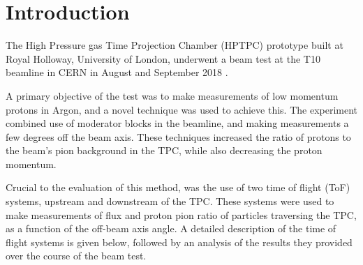 \section{Introduction}

The High Pressure gas Time Projection Chamber (HPTPC) prototype built at Royal Holloway, University of London, underwent a beam test at the T10 beamline in CERN in August and September 2018 \cite{SPSC-P-355}.

A primary objective of the test was to make measurements of low momentum protons in Argon, and a novel technique was used to achieve this.
The experiment combined use of moderator blocks in the beamline, and making measurements a few degrees off the beam axis.
These techniques increased the ratio of protons to the beam's pion background in the TPC, while also decreasing the proton momentum.

Crucial to the evaluation of this method, was the use of two time of flight (ToF) systems, upstream and downstream of the TPC.
These systems were used to make measurements of flux and proton pion ratio of particles traversing the TPC, as a function of the off-beam axis angle.
A detailed description of the time of flight systems is given below, followed by an analysis of the results they provided over the course of the beam test.
